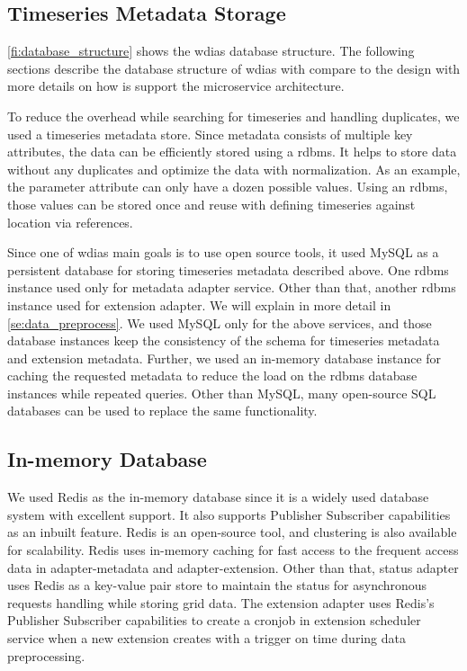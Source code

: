 \subsection{Timeseries Metadata Storage}
\label{subse:mysql}

\cref{fi:database_structure} shows the \acrshort{wdias} database structure.
The following sections describe the database structure of \acrshort{wdias} with compare to the design with more details on how is support the microservice architecture.

To reduce the overhead while searching for timeseries and handling duplicates, we used a timeseries metadata store. Since metadata consists of multiple key attributes, the data can be efficiently stored using a \acrfull{rdbms}. It helps to store data without any duplicates and optimize the data with normalization. As an example, the parameter attribute can only have a dozen possible values. Using an \acrshort{rdbms}, those values can be stored once and reuse with defining timeseries against location via references.

Since one of \acrshort{wdias} main goals is to use open source tools, it used MySQL as a persistent database for storing timeseries metadata described above. One \acrshort{rdbms} instance used only for metadata adapter service. Other than that, another \acrshort{rdbms} instance used for extension adapter. We will explain in more detail in \cref{se:data_preprocess}. We used MySQL only for the above services, and those database instances keep the consistency of the schema for timeseries metadata and extension metadata. Further, we used an in-memory database instance for caching the requested metadata to reduce the load on the \acrshort{rdbms} database instances while repeated queries. Other than MySQL, many open-source SQL databases can be used to replace the same functionality.

\subsection{In-memory Database}
\label{subse:redis}

We used Redis \cite{redisRedisDocumentation} as the in-memory database since it is a widely used database system with excellent support. It also supports Publisher Subscriber capabilities as an inbuilt feature. Redis is an open-source tool, and clustering is also available for scalability. Redis uses in-memory caching for fast access to the frequent access data in adapter-metadata and adapter-extension. Other than that, status adapter uses Redis as a key-value pair store to maintain the status for asynchronous requests handling while storing grid data. The extension adapter uses Redis's Publisher Subscriber capabilities to create a cronjob in extension scheduler service when a new extension creates with a trigger on time during data preprocessing.

